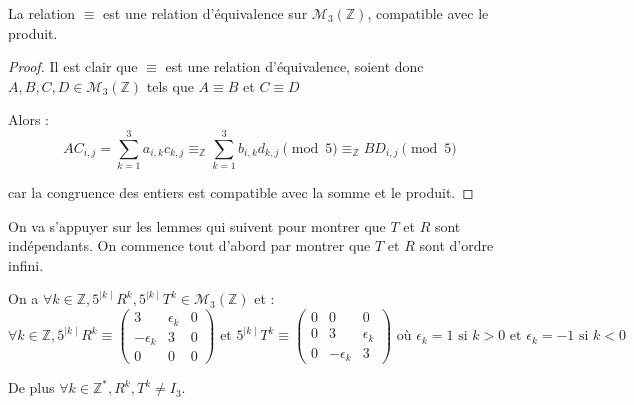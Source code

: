 \begin{lemma}\label{lemme4}
  La relation $\equiv$ est une relation d'équivalence sur $\mathcal{M}_3(\mathbb{Z})$, compatible avec le produit.
\end{lemma}
\begin{proof}
  \hfill

Il est clair que $\equiv$ est une relation d'équivalence, soient donc $A, B, C, D \in \mathcal{M}_3(\mathbb{Z})$ tels que $A \equiv B$ et $C \equiv D$\par Alors : $$AC_{i,j}=\sum_{k=1}^3 a_{i,k}c_{k,j} \equiv_\mathbb{Z} \sum_{k=1}^3 b_{i,k}d_{k,j} \pmod 5 \equiv_\mathbb{Z} BD_{i,j} \pmod 5$$\par
 car la congruence des entiers est compatible avec la somme et le produit.\par
\end{proof}
\noindent
On va s'appuyer sur les lemmes qui suivent pour montrer que $T$ et $R$ sont indépendants.
On commence tout d'abord par montrer que $T$ et $R$ sont d'ordre infini.
\begin{lemma}\label{lemme5}
  On a $\forall k \in \mathbb{Z}, 5^{\mid k \mid}R^k, 5^{\mid k \mid}T^k \in \mathcal{M}_3(\mathbb{Z})$ et :
  \[
  \forall k \in \mathbb{Z},
  5^{\mid k \mid}R^{k} \equiv \begin{pmatrix}
     3 & \epsilon_k & 0 \\
   -\epsilon_k & 3 & 0 \\
   0 & 0 & 0
  \end{pmatrix}
  \text{ et }
  5^{\mid k \mid}T^{k} \equiv \begin{pmatrix}
     0 & 0 & 0 \\
    0 & 3 & \epsilon_k \\
   0 & -\epsilon_k & 3
  \end{pmatrix}
  \text{ où $\epsilon_k = 1$ si $k>0$ et $\epsilon_k = -1$ si $k<0$}
  \]\par
  De plus $\forall k \in \mathbb{Z}^*, R^k, T^k \ne I_3$.
\end{lemma}

